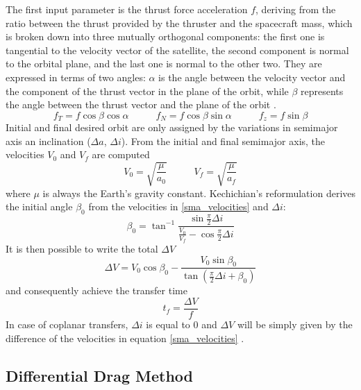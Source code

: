 The first input parameter is the thrust force acceleration $f$, deriving from the ratio between the thrust provided by the thruster and the spacecraft mass, which is broken down into three mutually orthogonal components:
the first one is tangential to the velocity vector of the satellite, the second component is normal to the orbital plane, and the last one is normal to the other two.
They are expressed in terms of two angles: 
$\alpha$ is the angle between the velocity vector and the component of the thrust vector in the plane of the orbit,
while $\beta$ represents the angle between the thrust vector and the plane of the orbit \cite{edelbaum1961propulsion}.
\begin{equation} \label{acceleration_thrust_components}
    f_T = f \cos{\beta} \cos{\alpha} \;\;\;\;\;\;\;\;\;\; f_N = f \cos{\beta} \sin{\alpha} \;\;\;\;\;\;\;\;\;\; f_z = f \sin{\beta}
\end{equation}
Initial and final desired orbit are only assigned by the variations in semimajor axis an inclination ($\Delta a$, $\Delta i$).
From the initial and final semimajor axis, the velocities $V_0$ and $V_f$ are computed 
\begin{equation} \label{sma_velocities}
    V_0 = \sqrt{\frac{\mu}{a_0}} \;\;\;\;\;\;\;\;\;\; V_f = \sqrt{\frac{\mu}{a_f}}
\end{equation}
where $\mu$ is always the Earth's gravity constant.
Kechichian's reformulation derives the initial angle $\beta_0$ from the velocities in \ref{sma_velocities} and $\Delta i$:
\begin{equation} \label{beta0}
    \beta_0 = \tan^{-1}{\frac{\sin{\frac{\pi}{2}}\Delta i}{\frac{V_0}{V_f} - \cos{\frac{\pi}{2}}\Delta i}}
\end{equation}
It is then possible to write the total $\Delta V$
\begin{equation} \label{deltaV}
    \Delta V = V_0 \cos{\beta_0} - \frac{V_0 \sin{\beta_0}}{\tan{\left(\frac{\pi}{2}\Delta i + \beta_0\right)}}
\end{equation}
and consequently achieve the transfer time
\begin{equation} \label{transfer_time}
    t_f = \frac{\Delta V}{f}
\end{equation}
In case of coplanar transfers, $\Delta i$ is equal to 0 and $\Delta V$ will be simply given by the difference of the velocities in equation \ref{sma_velocities} \cite{kechichian1992reformulation}.

\subsection{Differential Drag Method}


